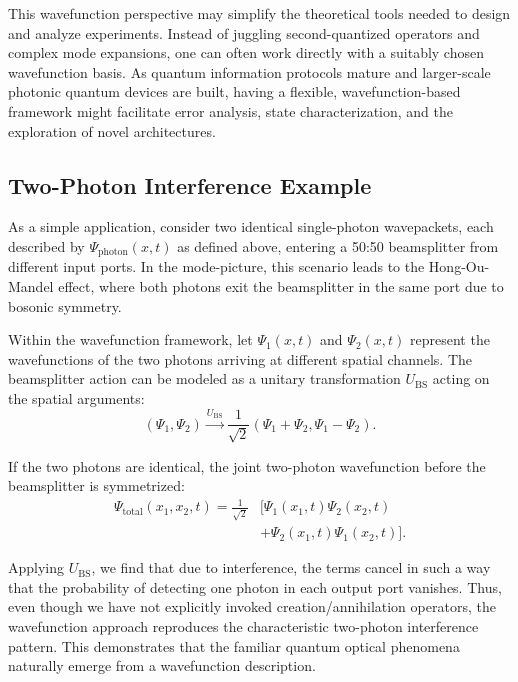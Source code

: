 \documentclass[aps,prl,twocolumn,showpacs,showkeys,superscriptaddress,amsmath,amssymb]{revtex4-2}
\begin{document}
This wavefunction perspective may simplify the theoretical tools needed to design and analyze experiments. Instead of juggling second-quantized operators and complex mode expansions, one can often work directly with a suitably chosen wavefunction basis. As quantum information protocols mature and larger-scale photonic quantum devices are built, having a flexible, wavefunction-based framework might facilitate error analysis, state characterization, and the exploration of novel architectures.

\subsection{Two-Photon Interference Example}

As a simple application, consider two identical single-photon wavepackets, each described by $\Psi_{\text{photon}}(x,t)$ as defined above, entering a 50:50 beamsplitter from different input ports. In the mode-picture, this scenario leads to the Hong-Ou-Mandel effect, where both photons exit the beamsplitter in the same port due to bosonic symmetry.

Within the wavefunction framework, let $\Psi_1(x,t)$ and $\Psi_2(x,t)$ represent the wavefunctions of the two photons arriving at different spatial channels. The beamsplitter action can be modeled as a unitary transformation $U_{\mathrm{BS}}$ acting on the spatial arguments:
\begin{equation}
(\Psi_1,\Psi_2) \xrightarrow{U_{\mathrm{BS}}} \frac{1}{\sqrt{2}}(\Psi_1 + \Psi_2, \Psi_1 - \Psi_2).
\end{equation}

If the two photons are identical, the joint two-photon wavefunction before the beamsplitter is symmetrized:
\begin{equation}
\begin{split}
\Psi_{\text{total}}(x_1,x_2,t) = \frac{1}{\sqrt{2}} & \bigl[\Psi_1(x_1,t)\Psi_2(x_2,t) \\
& + \Psi_2(x_1,t)\Psi_1(x_2,t)\bigr].
\end{split}
\end{equation}

Applying $U_{\mathrm{BS}}$, we find that due to interference, the terms cancel in such a way that the probability of detecting one photon in each output port vanishes. Thus, even though we have not explicitly invoked creation/annihilation operators, the wavefunction approach reproduces the characteristic two-photon interference pattern. This demonstrates that the familiar quantum optical phenomena naturally emerge from a wavefunction description.
\end{document}
